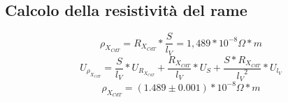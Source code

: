 \documentclass[a4paper]{article}
\begin{document}
\subsection{Calcolo della resistività del rame}
\begin{Large} 
	\begin{equation}
		\rho_{X_{CdT}} = R_{X_{CdT}}*\frac{S}{l_V} = 1,489*10^{-8} \Omega*m
	 \end{equation}
	 \begin{equation}
		U_{\rho_{X_{CdT}}} = \frac{S}{l_V}*U_{R_{X_{CdT}}}+\frac{R_{X_{CdT}}}{l_V}*U_S+\frac{S*R_{X_{CdT}}}{{l_V}^2}*U_{l_V}
	 \end{equation}
	 \begin{equation}
		\rho_{X_{CdT}} = (1.489\pm 0.001)*10^{-8} \Omega*m
	 \end{equation}
\end{Large}
\end{document}
